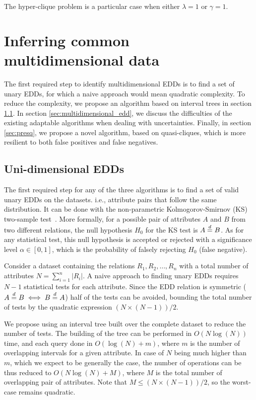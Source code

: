 The hyper-clique problem is a particular case when either $\lambda = 1$ or $\gamma = 1$.



\section{Inferring common multidimensional data}
\label{sec:presq_inferring}

The first required step to identify multidimensional \glspl{EDD} is to
find a set of unary \glspl{EDD}, for which a naive approach would
mean quadratic complexity. To reduce the complexity, we
propose an algorithm based on interval trees in
section \ref{sec:presq_unary}. In section
\ref{sec:multidimensional_edd}, we discuss the
difficulties of the existing adaptable algorithms
when dealing with uncertainties. Finally, in section
\ref{sec:presq}, we propose a novel algorithm, based on 
quasi-cliques, which is more resilient to both false positives
and false negatives.

\subsection{Uni-dimensional EDDs}
\label{sec:presq_unary}

The first required step for any of the three algorithms is to find a set of valid unary
\glspl{EDD} on the datasets. i.e., attribute pairs that follow
the same distribution. It can be done with the non-parametric
Kolmogorov-Smirnov (KS) two-sample test~\cite{Hodges1958}.
More formally, for a possible pair of attributes $A$ and $B$ from two different relations,
the null hypothesis $H_0$ for the KS test is $A \stackrel{d}{=} B$. As for any statistical test,
this null hypothesis is accepted or rejected with a significance level $\alpha \in [0,1]$,
which is the probability of falsely rejecting $H_0$ (false negative).

Consider a dataset containing the relations $R_1,R_2,\ldots,R_n$ with a total number of
attributes $N = \sum_{i=1}^n |R_i|$. A naive approach to finding unary \glspl{EDD} requires $N - 1$
statistical tests for each attribute. Since the \gls{EDD} relation is symmetric
($A \stackrel{d}{=} B \iff B \stackrel{d}{=} A$) half of the tests can be avoided, bounding the total number
of tests by the quadratic expression $(N \times (N - 1)) / 2$.

We propose using an interval tree built over the complete dataset to reduce the number of tests.
The building of the tree can be performed in $O(N \log(N))$ time, and each query done in
$O(\log(N) + m)$, where $m$ is the number of overlapping intervals for a given attribute.
In case of $N$ being much higher than $m$, which we expect to be generally the case, the number of operations can be thus
reduced to $O(N \log(N) + M)$, where $M$ is the total number of overlapping pair of attributes.
Note that $M \le (N \times (N - 1)) / 2$, so the worst-case remains quadratic.

